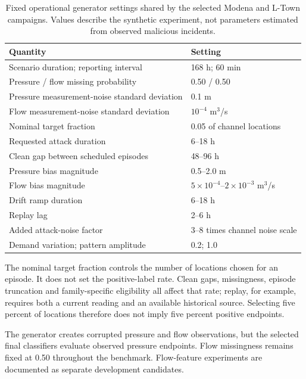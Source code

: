 \begin{table}[tbp]
\centering\small
\caption[Fixed operational generator settings shared by the selected Modena and L-Town campaigns]{Fixed operational generator settings shared by the selected Modena and L-Town campaigns. Values describe the synthetic experiment, not parameters estimated from observed malicious incidents.}
\label{tab:generator}
\begin{tabularx}{\linewidth}{@{}Yl@{}}
\toprule
Quantity & Setting\\
\midrule
Scenario duration; reporting interval & 168 h; 60 min\\
Pressure / flow missing probability & 0.50 / 0.50\\
Pressure measurement-noise standard deviation & 0.1 m\\
Flow measurement-noise standard deviation & $10^{-4}$ m$^3$/s\\
Nominal target fraction & 0.05 of channel locations\\
Requested attack duration & 6--18 h\\
Clean gap between scheduled episodes & 48--96 h\\
Pressure bias magnitude & 0.5--2.0 m\\
Flow bias magnitude & $5\times10^{-4}$--$2\times10^{-3}$ m$^3$/s\\
Drift ramp duration & 6--18 h\\
Replay lag & 2--6 h\\
Added attack-noise factor & 3--8 times channel noise scale\\
Demand variation; pattern amplitude & 0.2; 1.0\\
\bottomrule
\end{tabularx}
\end{table}

The nominal target fraction controls the number of locations chosen for an episode. It does not set the positive-label rate. Clean gaps, missingness, episode truncation and family-specific eligibility all affect that rate; replay, for example, requires both a current reading and an available historical source. Selecting five percent of locations therefore does not imply five percent positive endpoints.

The generator creates corrupted pressure and flow observations, but the selected final classifiers evaluate observed pressure endpoints. Flow missingness remains fixed at 0.50 throughout the benchmark. Flow-feature experiments are documented as separate development candidates.

